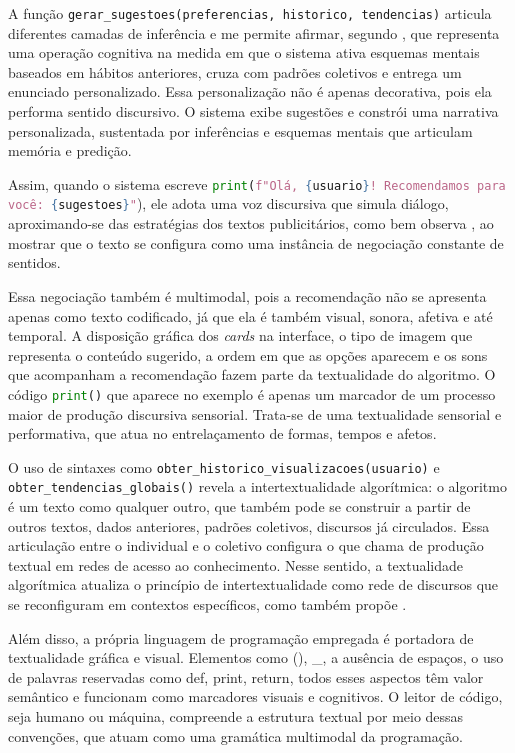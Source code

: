 \documentclass[portuguese]{textolivre}
\begin{document}
A função \lstinline[language=Python]{gerar_sugestoes(preferencias, historico, tendencias)} articula diferentes camadas de inferência e me permite afirmar, segundo \textcite{koch2006}, que representa uma operação cognitiva na medida em que o sistema ativa esquemas mentais baseados em hábitos anteriores, cruza com padrões coletivos e entrega um enunciado personalizado. Essa personalização não é apenas decorativa, pois ela performa sentido discursivo. O sistema exibe sugestões e constrói uma narrativa personalizada, sustentada por inferências e esquemas mentais que articulam memória e predição.

Assim, quando o sistema escreve \lstinline[language=Python]|print(f"Olá, {usuario}! Recomendamos para você: {sugestoes}"|), ele adota uma voz discursiva que simula diálogo, aproximando-se das estratégias dos textos publicitários, como bem observa \textcite{marcuschi2008}, ao mostrar que o texto se configura como uma instância de negociação constante de sentidos.

Essa negociação também é multimodal, pois a recomendação não se apresenta apenas como texto codificado, já que ela é também visual, sonora, afetiva e até temporal. A disposição gráfica dos \textit{cards} na interface, o tipo de imagem que representa o conteúdo sugerido, a ordem em que as opções aparecem e os sons que acompanham a recomendação fazem parte da textualidade do algoritmo. O código \lstinline[language=Python]{print()} que aparece no exemplo é apenas um marcador de um processo maior de produção discursiva sensorial. Trata-se de uma textualidade sensorial e performativa, que atua no entrelaçamento de formas, tempos e afetos.

O uso de sintaxes como \lstinline[language=Python]{obter_historico_visualizacoes(usuario)} e \lstinline[language=Python]{obter_tendencias_globais()} revela a intertextualidade algorítmica: o algoritmo é um texto como qualquer outro, que também pode se construir a partir de outros textos, dados anteriores, padrões coletivos, discursos já circulados. Essa articulação entre o individual e o coletivo configura o que \textcite{beaugrande1997} chama de produção textual em redes de acesso ao conhecimento. Nesse sentido, a textualidade algorítmica atualiza o princípio de intertextualidade como rede de discursos que se reconfiguram em contextos específicos, como também propõe \textcite{beaugrande1997}.

Além disso, a própria linguagem de programação empregada é portadora de textualidade gráfica e visual. Elementos como (), \_, a ausência de espaços, o uso de palavras reservadas como def, print, return, todos esses aspectos têm valor semântico e funcionam como marcadores visuais e cognitivos. O leitor de código, seja humano ou máquina, compreende a estrutura textual por meio dessas convenções, que atuam como uma gramática multimodal da programação.
\end{document}

